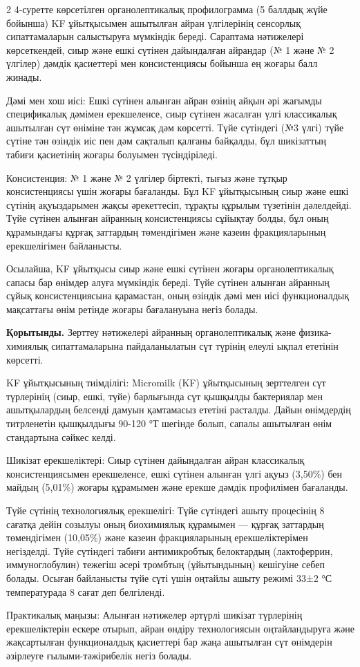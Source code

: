 \begin{multicols}{2}
4-суретте көрсетілген органолептикалық профилограмма (5 баллдық жүйе
бойынша) KF ұйытқысымен ашытылған айран үлгілерінің сенсорлық
сипаттамаларын салыстыруға мүмкіндік береді. Сараптама нәтижелері
көрсеткендей, сиыр және ешкі сүтінен дайындалған айрандар (№ 1 және № 2
үлгілер) дәмдік қасиеттері мен консистенциясы бойынша ең жоғары балл
жинады.

Дәмі мен хош иісі: Ешкі сүтінен алынған айран өзінің айқын әрі жағымды
спецификалық дәмімен ерекшеленсе, сиыр сүтінен жасалған үлгі классикалық
ашытылған сүт өніміне тән жұмсақ дәм көрсетті. Түйе сүтіндегі (№3 үлгі)
түйе сүтіне тән өзіндік иіс пен дәм сақталып қалғаны байқалды, бұл
шикізаттың табиғи қасиетінің жоғары болуымен түсіндіріледі.

Консистенция: № 1 және № 2 үлгілер біртекті, тығыз және тұтқыр
консистенциясы үшін жоғары бағаланды. Бұл KF ұйытқысының сиыр және ешкі
сүтінің ақуыздарымен жақсы әрекеттесіп, тұрақты құрылым түзетінін
дәлелдейді. Түйе сүтінен алынған айранның консистенциясы сұйықтау болды,
бұл оның құрамындағы құрғақ заттардың төмендігімен және казеин
фракцияларының ерекшелігімен байланысты.

Осылайша, KF ұйытқысы сиыр және ешкі сүтінен жоғары органолептикалық
сапасы бар өнімдер алуға мүмкіндік береді. Түйе сүтінен алынған айранның
сұйық консистенциясына қарамастан, оның өзіндік дәмі мен иісі
функционалдық мақсаттағы өнім ретінде жоғары бағалануына негіз болады.

{\bfseries Қорытынды.} Зерттеу нәтижелері айранның органолептикалық және
физика-химиялық сипаттамаларына пайдаланылатын сүт түрінің елеулі ықпал
ететінін көрсетті.

KF ұйытқысының тиімділігі: Micromilk (KF) ұйытқысының зерттелген сүт
түрлерінің (сиыр, ешкі, түйе) барлығында сүт қышқылды бактериялар мен
ашытқылардың белсенді дамуын қамтамасыз ететіні расталды. Дайын
өнімдердің титрленетін қышқылдығы 90-120 °Т шегінде болып, сапалы
ашытылған өнім стандартына сәйкес келді.

Шикізат ерекшеліктері: Сиыр сүтінен дайындалған айран классикалық
консистенциясымен ерекшеленсе, ешкі сүтінен алынған үлгі ақуыз (3,50\%)
бен майдың (5,01\%) жоғары құрамымен және ерекше дәмдік профилімен
бағаланды.

Түйе сүтінің технологиялық ерекшелігі: Түйе сүтіндегі ашыту процесінің 8
сағатқа дейін созылуы оның биохимиялық құрамымен --- құрғақ заттардың
төмендігімен (10,05\%) және казеин фракцияларының ерекшеліктерімен
негізделді. Түйе сүтіндегі табиғи антимикробтық белоктардың
(лактоферрин, иммуноглобулин) тежегіш әсері тромбтың (ұйытындының)
кешігуіне себеп болады. Осыған байланысты түйе сүті үшін оңтайлы ашыту
режимі 33±2 °С температурада 8 сағат деп белгіленді.

Практикалық маңызы: Алынған нәтижелер әртүрлі шикізат түрлерінің
ерекшеліктерін ескере отырып, айран өндіру технологиясын оңтайландыруға
және жақсартылған функционалдық қасиеттері бар жаңа ашытылған сүт
өнімдерін әзірлеуге ғылыми-тәжірибелік негіз болады.
\end{multicols}

